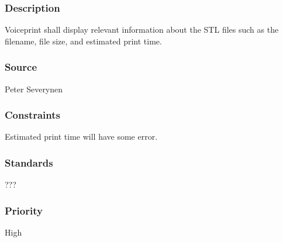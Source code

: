 \subsubsection{Description}
Voiceprint shall display relevant information about the STL files such as the filename, file size, and estimated print time.
\subsubsection{Source}
Peter Severynen
\subsubsection{Constraints}
Estimated print time will have some error.
\subsubsection{Standards}
???
\subsubsection{Priority}
High